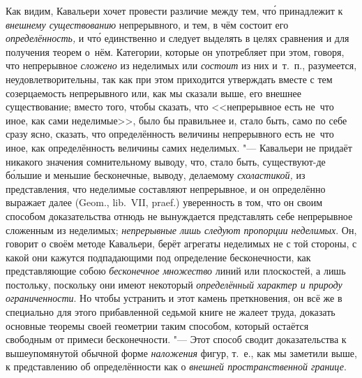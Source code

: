 Как видим, Кавальери хочет провести различие между тем, чт\'{о} принадлежит к
{\em внешнему существованию} непрерывного, и тем, в чём состоит его
{\em определённость,} и чт\'{о} единственно и следует выделять в целях сравнения и
для получения теорем о~нём. Категории, которые он употребляет при этом, говоря,
что непрерывное {\em сложено} из неделимых или {\em состоит} из них и~т.~п.,
разумеется, неудовлетворительны, так как при этом приходится утверждать вместе
с тем созерцаемость непрерывного или, как мы сказали выше, его внешнее
существование; вместо того, чтобы сказать, что <<непрерывное есть не~что иное,
как сами неделимые>>, было бы правильнее и, стало быть, само по себе сразу
ясно, сказать, что определённость величины непрерывного есть не~что иное, как
определённость величины самих неделимых. "--- Кавальери не придаёт никакого
значения сомнительному выводу, что, стало быть, существуют-де б\'{о}льшие и меньшие
бесконечные, выводу, делаемому {\em схоластикой,} из представления, что неделимые
составляют непрерывное, и он определённо выражает далее (Geom., lib.~VII,
praef.) уверенность в том, что он своим способом доказательства отнюдь не
вынуждается представлять себе непрерывное сложенным из неделимых;
{\em непрерывные лишь следуют пропорции неделимых}. Он, говорит о своём методе
Кавальери, берёт агрегаты неделимых не с той стороны, с какой они кажутся
подпадающими под определение бесконечности, как представляющие собою
{\em бесконечное множество} линий или плоскостей, а лишь постольку, поскольку
они имеют некоторый {\em определённый характер и природу ограниченности}. Но
чтобы устранить и этот камень преткновения, он всё же в специально для этого
прибавленной седьмой книге не жалеет труда, доказать основные теоремы своей
геометрии таким способом, который остаётся свободным от примеси бесконечности.
"--- Этот способ сводит доказательства к вышеупомянутой обычной форме
{\em наложения} фигур, т.~е., как мы заметили выше, к представлению об
определённости как о {\em внешней пространственной границе}.

